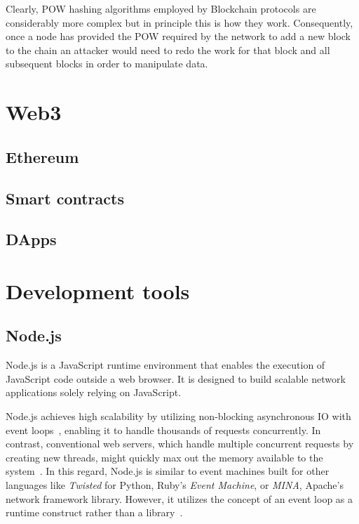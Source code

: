 Clearly, \gls{POW} hashing algorithms employed by \gls{Blockchain} protocols are considerably more complex but in principle this is how they work.
Consequently, once a node has provided the \gls{POW} required by the network to add a new block to the chain an attacker would need to redo the work for that block and all subsequent blocks in order to manipulate data.

\section{Web3}\label{sec:web3}

\subsection{Ethereum}\label{subsec:ethereum}
\subsection{Smart contracts}\label{subsec:smart-contracts}
\subsection{DApps}\label{subsec:dapps}

\section{Development tools}\label{sec:development-tools}

\subsection{Node.js}\label{subsec:node.js}

Node.js is a JavaScript runtime environment that enables the execution of JavaScript code outside a web browser.
It is designed to build scalable network applications solely relying on JavaScript.

Node.js achieves high scalability by utilizing non-blocking asynchronous \gls{IO} with event loops~\autocites{openjs_foundation_about_nodate}[74]{shah_nodejs_2017}, enabling it to handle thousands of requests concurrently.
In contrast, conventional web servers, which handle multiple concurrent requests by creating new threads, might quickly max out the memory available to the system~\autocite[7-8]{chhetri_comparative_2016}.
In this regard, Node.js is similar to event machines built for other languages like \emph{Twisted} for Python, Ruby's \emph{Event Machine}, or \emph{MINA}, Apache's network framework library.
However, it utilizes the concept of an event loop as a runtime construct rather than a library~\autocite{openjs_foundation_about_nodate}.

